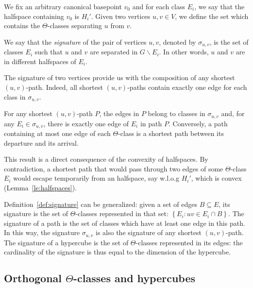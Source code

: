\documentclass[a4paper,UKenglish,numberwithinsect,cleveref, autoref,anonymous]{lipics-v2021}
\newcommand{\set}[1]{\left\{ #1 \right\}}
\begin{document}
We fix an arbitrary canonical basepoint $v_0$ and for each class $E_i$, we say that the halfspace containing $v_0$ is $H_i'$.
Given two vertices $u,v \in V$, we define the set which contains the $\Theta$-classes separating $u$ from $v$.

\begin{definition}
We say that the {\em signature} of the pair of vertices $u,v$, denoted by $\sigma_{u,v}$, is the set of classes $E_i$ such that $u$ and $v$ are separated in $G\backslash E_i$. In other words, $u$ and $v$ are in different halfspaces of $E_i$.
\label{def:signature}
\end{definition}

The signature of two vertices provide us with the composition of any shortest $(u,v)$-path. Indeed, all shortest $(u,v)$-paths contain exactly one edge for each class in $\sigma_{u,v}$.

\begin{lemma}
For any shortest $(u,v)$-path $P$, the edges in $P$ belong to classes in $\sigma_{u,v}$ and, for any $E_i \in \sigma_{u,v}$, there is exactly one edge of $E_i$ in path $P$. Conversely, a path containing at most one edge of each $\Theta$-class is a shortest path between its departure and its arrival.
\label{le:signature}
\end{lemma}

This result is a direct consequence of the convexity of halfspaces. By contradiction, a shortest path that would pass through two edges of some $\Theta$-class $E_i$ would escape temporarily from an halfspace, say w.l.o.g $H_i'$,  which is convex (Lemma~\ref{le:halfspaces}).

Definition~\ref{def:signature} can be generalized: given a set of edges $B\subseteq E$, its signature is the set of $\Theta$-classes represented in that set: $\set{E_i : uv \in E_i \cap B}$. The signature of a path is the set of classes which have at least one edge in this path. In this way, the signature $\sigma_{u,v}$ is also the signature of any shortest $(u,v)$-path. The signature of a hypercube is the set of $\Theta$-classes represented in its edges: the cardinality of the signature is thus equal to the dimension of the hypercube.

\subsection{Orthogonal $\Theta$-classes and hypercubes} \label{asubsec:orthogonal}
\end{document}
